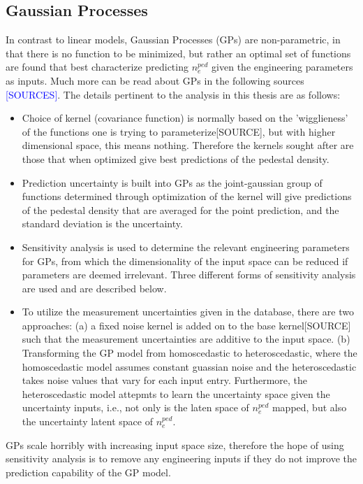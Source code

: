 \documentclass[a4paper, twoside, final, 12pt]{article}
\begin{document}
\subsection{Gaussian Processes}
In contrast to linear models, Gaussian Processes (GPs) are non-parametric, in that there is no function to be minimized, but rather an optimal set of functions are found that best characterize predicting $n_e^{ped}$ given the engineering parameters as inputs.
Much more can be read about GPs in the following sources \textcolor{blue}{[SOURCES]}.
The details pertinent to the analysis in this thesis are as follows:
\begin{itemize}
	\item Choice of kernel (covariance function) is normally based on the 'wigglieness' of the functions one is trying to parameterize[SOURCE], but with higher dimensional space, this means nothing. Therefore the kernels sought after are those that when optimized give best predictions of the pedestal density.
	\item Prediction uncertainty is built into GPs as the joint-gaussian group of functions determined through optimization of the kernel will give predictions of the pedestal density that are averaged for the point prediction, and the standard deviation is the uncertainty. 
	\item Sensitivity analysis is used to determine the relevant engineering parameters for GPs, from which the dimensionality of the input space can be reduced if parameters are deemed irrelevant. Three different forms of sensitivity analysis are used and are described below. 
	\item To utilize the measurement uncertainties given in the database, there are two approaches: (a) a fixed noise kernel is added on to the base kernel[SOURCE] such that the measurement uncertainties are additive to the input space. (b) Transforming the GP model from homoscedastic to heteroscedastic, where the homoscedastic model assumes constant guassian noise and the heteroscedastic takes noise values that vary for each input entry. Furthermore, the heteroscedastic model attepmts to learn the uncertainty space given the uncertainty inputs, i.e., not only is the laten space of $n_e^{ped}$ mapped, but also the uncertainty latent space of $n_e^{ped}$.   
\end{itemize}

GPs scale horribly with increasing input space size, therefore the hope of using sensitivity analysis is to remove any engineering inputs if they do not improve the prediction capability of the GP model.
\end{document}

